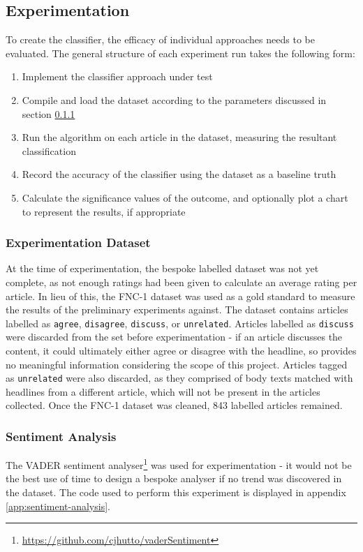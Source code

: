\subsection{Experimentation}
To create the classifier, the efficacy of individual approaches needs to be evaluated. The general structure of each experiment run takes the following form:

\begin{enumerate}
	\item Implement the classifier approach under test
	\item Compile and load the dataset according to the parameters discussed in section \ref{experimentation-data}
	\item Run the algorithm on each article in the dataset, measuring the resultant classification
	\item Record the accuracy of the classifier using the dataset as a baseline truth
	\item Calculate the significance	values of the outcome, and optionally plot a chart to represent the results, if appropriate
\end{enumerate}

\subsubsection{Experimentation Dataset}\label{experimentation-data}
At the time of experimentation, the bespoke labelled dataset was not yet complete, as not enough ratings had been given to calculate an average rating per article. In lieu of this, the FNC-1 dataset was used as a gold standard to measure the results of the preliminary experiments against. The dataset contains articles labelled as \texttt{agree}, \texttt{disagree}, \texttt{discuss}, or \texttt{unrelated}. Articles labelled as \texttt{discuss} were discarded from the set before experimentation - if an article discusses the content, it could ultimately either agree or disagree with the headline, so provides no meaningful information considering the scope of this project. Articles tagged as \texttt{unrelated} were also discarded, as they comprised of body texts matched with headlines from a different article, which will not be present in the articles collected. Once the FNC-1 dataset was cleaned, 843 labelled articles remained.


\subsubsection{Sentiment Analysis}
The VADER sentiment analyser\footnote{\url{https://github.com/cjhutto/vaderSentiment}} was used for experimentation - it would not be the best use of time to design a bespoke analyser if no trend was discovered in the dataset. The code used to perform this experiment is displayed in appendix \ref{app:sentiment-analysis}.


